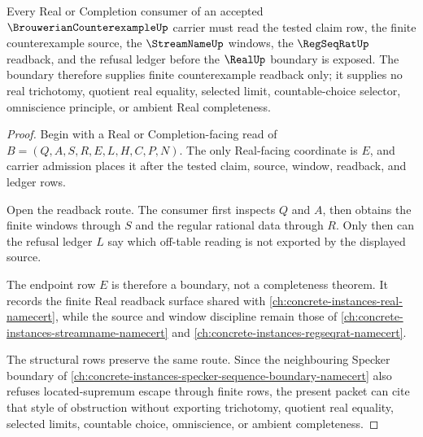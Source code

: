 \begin{theorem}\label{thm:brouwerian-counterexample-real-boundary}
Every Real or Completion consumer of an accepted $\BrouwerianCounterexampleUp$ carrier must read the tested claim row, the finite counterexample source, the $\StreamNameUp$ windows, the $\RegSeqRatUp$ readback, and the refusal ledger before the $\RealUp$ boundary is exposed. The boundary therefore supplies finite counterexample readback only; it supplies no real trichotomy, quotient real equality, selected limit, countable-choice selector, omniscience principle, or ambient Real completeness.
\end{theorem}
\begin{proof}
Begin with a Real or Completion-facing read of $B=(Q,A,S,R,E,L,H,C,P,N)$. The only Real-facing coordinate is $E$, and carrier admission places it after the tested claim, source, window, readback, and ledger rows.

Open the readback route. The consumer first inspects $Q$ and $A$, then obtains the finite windows through $S$ and the regular rational data through $R$. Only then can the refusal ledger $L$ say which off-table reading is not exported by the displayed source.

The endpoint row $E$ is therefore a boundary, not a completeness theorem. It records the finite Real readback surface shared with \autoref{ch:concrete-instances-real-namecert}, while the source and window discipline remain those of \autoref{ch:concrete-instances-streamname-namecert} and \autoref{ch:concrete-instances-regseqrat-namecert}.

The structural rows preserve the same route. Since the neighbouring Specker boundary of \autoref{ch:concrete-instances-specker-sequence-boundary-namecert} also refuses located-supremum escape through finite rows, the present packet can cite that style of obstruction without exporting trichotomy, quotient real equality, selected limits, countable choice, omniscience, or ambient completeness.
\end{proof}



